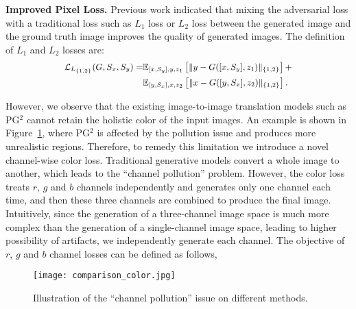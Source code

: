 \documentclass[sigconf]{acmart}
\begin{document}
\noindent \textbf{Improved Pixel Loss.} Previous work indicated that mixing the adversarial loss with a traditional loss such as $L_1$ loss \cite{isola2017image} or $L_2$ loss \cite{pathak2016context} between the generated image and the ground truth image improves the quality of generated images.
The definition of $L_1$ and $L_2$ losses are:
\begin{equation}\small
\begin{aligned}
\mathcal{L}_{L_{\{1,2\}}}(G, S_x, S_y) = &\mathbb{E}_{[x, S_y], y, z_1} \left[ \lVert y - G([x, S_y], z_1) \lVert_{\{1,2\}} \right] + \\
&\mathbb{E}_{[y, S_x], x, z_2} \left[ \lVert x - G([y, S_x], z_2) \lVert_{\{1,2\}} \right].
\end{aligned}
\label{equ:l2}
\end{equation}

However, we observe that the existing image-to-image translation models such as PG$^2$ \cite{ma2017pose} cannot retain the holistic color of the input images.
An example is shown in Figure~\ref{fig:first_figure}, where PG$^2$ is affected by the pollution issue and produces more unrealistic regions. 
Therefore, to remedy this limitation we introduce a novel channel-wise color loss.
Traditional generative models convert a whole image to another, which leads to the ``channel pollution'' problem.
However, the color loss treats $r$, $g$ and $b$ channels independently and generates only one channel each time, and then these three channels are combined to produce the final image.
Intuitively, since the generation of a three-channel image space is much more complex than the generation of a single-channel image space, leading to higher possibility of artifacts, we independently generate each channel.
The objective of $r$, $g$ and $b$ channel losses can be defined as follows,
\begin{figure}[!t] \tiny
	\centering
	\texttt{[image: comparison\_color.jpg]}
	\caption{Illustration of the ``channel pollution'' issue on different methods.}
	\label{fig:first_figure}
	\vspace{-0.3cm}
\end{figure}
\end{document}
